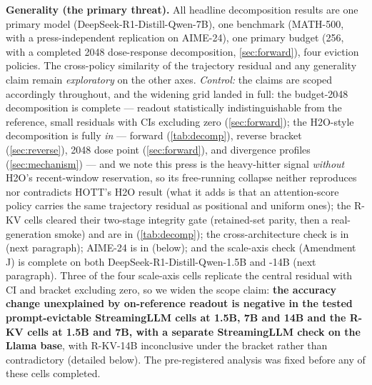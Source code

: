 \documentclass{article}
\begin{document}
\textbf{Generality (the primary threat).} All headline decomposition results are one primary model (DeepSeek-R1-Distill-Qwen-7B), one benchmark (MATH-500, with a press-independent replication on AIME-24), one primary budget (256, with a completed 2048 dose-response decomposition, \cref{sec:forward}), four eviction policies. The cross-policy similarity of the trajectory residual and any generality claim remain \emph{exploratory} on the other axes. \emph{Control:} the claims are scoped accordingly throughout, and the widening grid landed in full: the budget-2048 decomposition is complete --- readout statistically indistinguishable from the reference, small residuals with CIs excluding zero (\cref{sec:forward}); the H2O-style decomposition is fully \emph{in} --- forward (\cref{tab:decomp}), reverse bracket (\cref{sec:reverse}), 2048 dose point (\cref{sec:forward}), and divergence profiles (\cref{sec:mechanism}) --- and we note this press is the heavy-hitter signal \emph{without} H2O's recent-window reservation, so its free-running collapse neither reproduces nor contradicts HOTT's H2O result (what it adds is that an attention-score policy carries the same trajectory residual as positional and uniform ones); the R-KV cells cleared their two-stage integrity gate (retained-set parity, then a real-generation smoke) and are in (\cref{tab:decomp}); the cross-architecture check is in (next paragraph); AIME-24 is in (below); and the scale-axis check (Amendment J) is complete on both DeepSeek-R1-Distill-Qwen-1.5B and -14B (next paragraph). Three of the four scale-axis cells replicate the central residual with CI and bracket excluding zero, so we widen the scope claim: \textbf{the accuracy change unexplained by on-reference readout is negative in the tested prompt-evictable StreamingLLM cells at 1.5B, 7B and 14B and the R-KV cells at 1.5B and 7B, with a separate StreamingLLM check on the Llama base}, with R-KV-14B inconclusive under the bracket rather than contradictory (detailed below). The pre-registered analysis was fixed before any of these cells completed.
\end{document}
